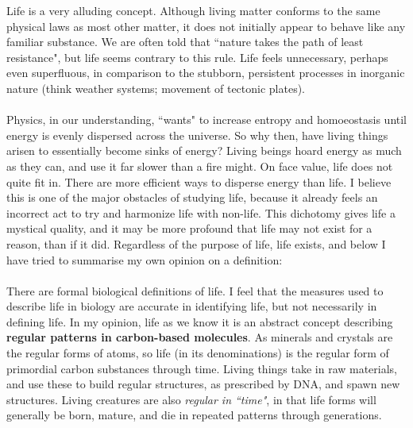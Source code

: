 \documentclass[10pt,a4paper]{article}
\begin{document}
				Life is a very alluding concept. Although living matter conforms to the same physical laws as most other matter, it does not initially appear to behave like any familiar substance. We are often told that ``nature takes the path of least resistance", but life seems contrary to this rule. Life feels unnecessary, perhaps even superfluous, in comparison to the stubborn, persistent processes in inorganic nature (think weather systems; movement of tectonic plates). 
				\\\\
				Physics, in our understanding, ``wants" to increase entropy and homoeostasis until energy is evenly dispersed across the universe. So why then, have living things arisen to essentially become sinks of energy? Living beings hoard energy as much as they can, and use it far slower than a fire might. On face value, life does not quite fit in. There are more efficient ways to disperse energy than life. I believe this is one of the major obstacles of studying life, because it already feels an incorrect act to try and harmonize life with non-life. This dichotomy gives life a mystical quality, and it may be more profound that life may not exist for a reason, than if it did. Regardless of the purpose of life, life exists, and below I have tried to summarise my own opinion on a definition:
				\\\\
				There are formal biological definitions of life. I feel that the measures used to describe life in biology are accurate in identifying life, but not necessarily in defining life.  In my opinion, life as we know it is an abstract concept describing \textbf{regular patterns in carbon-based molecules}. As minerals and crystals are the regular forms of atoms, so life (in its denominations) is the regular form of primordial carbon substances through time. Living things take in raw materials, and use these to build regular structures, as prescribed by DNA, and spawn new structures. Living creatures are also \textsl{regular in ``time"}, in that life forms will generally be born, mature, and die in repeated patterns through generations.
				
\end{document}
